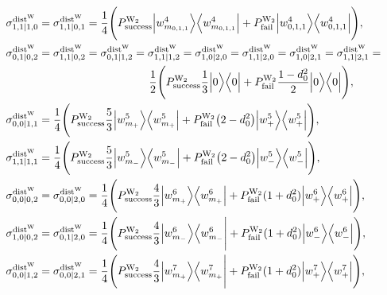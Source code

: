 \documentclass[reprint,superscriptaddress,nofootinbib,amsmath,amssymb,aps,pra,longbibliography]{revtex4-1}
\begin{document}
\begin{widetext}
\begin{align}
	 \sigma_{1,1|1,0}^{\text{dist}^{\text{W}}} &= \sigma_{1,1|0,1}^{\text{dist}^{\text{W}}} = \dfrac{1}{4} \Bigg( P_{\text{success}}^{\text{W}_2} \Big| w_{m_{0,1,1}}^4 \Big\rangle \Big\langle w_{m_{0,1,1}}^4 \Big| + P_{\text{fail}}^{\text{W}_2} \Big| w_{0,1,1}^4 \Big\rangle \Big\langle w_{0,1,1}^4 \Big| \Bigg), \nonumber \\
	\sigma_{0,1|0,2}^{\text{dist}^{\text{W}}} &=\sigma_{1,1|0,2}^{\text{dist}^{\text{W}}} =\sigma_{0,1|1,2}^{\text{dist}^{\text{W}}} = \sigma_{1,1|1,2}^{\text{dist}^{\text{W}}} = \sigma_{1,0|2,0}^{\text{dist}^{\text{W}}} = \sigma_{1,1|2,0}^{\text{dist}^{\text{W}}} = \sigma_{1,0|2,1}^{\text{dist}^{\text{W}}} = \sigma_{1,1|2,1}^{\text{dist}^{\text{W}}}=  \nonumber \\
	& \hspace{3.5cm}  \dfrac{1}{2} \Bigg( P_{\text{success}}^{\text{W}_2} \dfrac{1}{3} \Big| 0 \Big\rangle \Big\langle 0 \Big| + P_{\text{fail}}^{\text{W}_2} \frac{1-d_0^2}{2} \Big| 0 \Big\rangle \Big\langle 0 \Big| \Bigg), \nonumber \\
\sigma_{0,0|1,1}^{\text{dist}^{\text{W}}} &=  \dfrac{1}{4} \Bigg( P_{\text{success}}^{\text{W}_2} \dfrac{5}{3} \Big| w_{m_{+}}^5 \Big\rangle \Big\langle w_{m_{+}}^5 \Big| +P_{\text{fail}}^{\text{W}_2} \big(2-d_0^2 \big) \Big| w_{+}^5 \Big\rangle \Big\langle w_{+}^5 \Big| \Bigg), \nonumber \\
     \sigma_{1,1|1,1}^{\text{dist}^{\text{W}}} &=  \dfrac{1}{4} \Bigg( P_{\text{success}}^{\text{W}_2} \dfrac{5}{3} \Big| w_{m_{-}}^5 \Big\rangle \Big\langle w_{m_{-}}^5 \Big| +P_{\text{fail}}^{\text{W}_2} \big(2-d_0^2 \big) \Big| w_{-}^5 \Big\rangle \Big\langle w_{-}^5 \Big| \Bigg), \nonumber \\
     \sigma_{0,0|0,2}^{\text{dist}^{\text{W}}} &= \sigma_{0,0|2,0}^{\text{dist}^{\text{W}}} = \dfrac{1}{4} \Bigg( P_{\text{success}}^{\text{W}_2} \dfrac{4}{3} \Big| w_{m_{+}}^6 \Big\rangle \Big\langle w_{m_{+}}^6 \Big| + P_{\text{fail}}^{\text{W}_2} (1+d_0^2) \Big| w_{+}^6 \Big\rangle \Big\langle w_{+}^6 \Big| \Bigg), \nonumber \\
     \sigma_{1,0|0,2}^{\text{dist}^{\text{W}}} &= \sigma_{0,1|2,0}^{\text{dist}^{\text{W}}} = \dfrac{1}{4} \Bigg( P_{\text{success}}^{\text{W}_2} \dfrac{4}{3} \Big| w_{m_{-}}^6 \Big\rangle \Big\langle w_{m_{-}}^6 \Bigg| + P_{\text{fail}}^{\text{W}_2} (1+d_0^2) \Big| w_{-}^6 \Big\rangle \Big\langle w_{-}^6 \Big| \Bigg), \nonumber \\
     \sigma_{0,0|1,2}^{\text{dist}^{\text{W}}} &= \sigma_{0,0|2,1}^{\text{dist}^{\text{W}}} = \dfrac{1}{4} \Bigg( P_{\text{success}}^{\text{W}_2} \dfrac{4}{3} \Big| w_{m_{+}}^7 \Big\rangle \Big\langle w_{m_{+}}^7 \Bigg| + P_{\text{fail}}^{\text{W}_2} (1+d_0^2) \Big| w_{+}^7 \Big\rangle \Big\langle w_{+}^7 \Big| \Bigg), \nonumber \\

\end{align}
\end{widetext}
\end{document}
